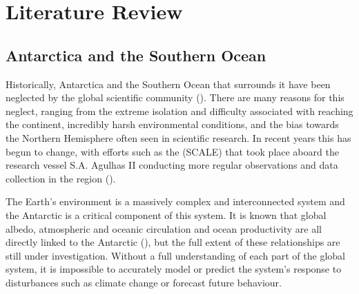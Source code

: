 \chapter{Literature Review}
\label{ch:lit_review}



\section{Antarctica and the Southern Ocean}
\label{sec:ch2.section1}

Historically, Antarctica and the Southern Ocean that surrounds it have been neglected by the global scientific community (\cite{kennicuttSustainedAntarcticResearch2019}). There are many reasons for this neglect, ranging from the extreme isolation and difficulty associated with reaching the continent, incredibly harsh environmental conditions, and the bias towards the Northern Hemisphere often seen in scientific research. In recent years this has begun to change, with efforts such as the (\ac{SCALE}) that took place aboard the research vessel S.A. Agulhas II conducting more regular observations and data collection in the region (\cite{vichiSCALEWIN22CruiseReport2023}).

The Earth's environment is a massively complex and interconnected system and the Antarctic is a critical component of this system. It is known that global albedo, atmospheric and oceanic circulation and ocean productivity are all directly linked to the Antarctic (\cite{eayrsUnderstandingSeasonalCycle2019}), but the full extent of these relationships are still under investigation. Without a full understanding of each part of the global system, it is impossible to accurately model or predict the system's response to disturbances such as climate change or forecast future behaviour.

